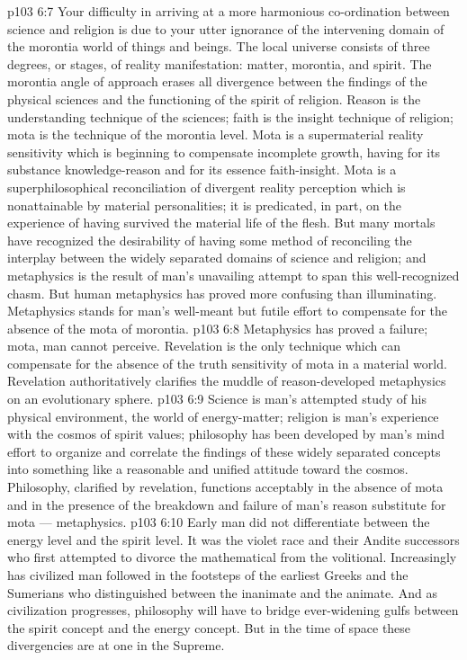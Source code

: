 \vs p103 6:7 Your difficulty in arriving at a more harmonious co\hyp{}ordination between science and religion is due to your utter ignorance of the intervening domain of the morontia world of things and beings. The local universe consists of three degrees, or stages, of reality manifestation: matter, morontia, and spirit. The morontia angle of approach erases all divergence between the findings of the physical sciences and the functioning of the spirit of religion. Reason is the understanding technique of the sciences; faith is the insight technique of religion; mota is the technique of the morontia level. Mota is a supermaterial reality sensitivity which is beginning to compensate incomplete growth, having for its substance knowledge\hyp{}reason and for its essence faith\hyp{}insight. Mota is a superphilosophical reconciliation of divergent reality perception which is nonattainable by material personalities; it is predicated, in part, on the experience of having survived the material life of the flesh. But many mortals have recognized the desirability of having some method of reconciling the interplay between the widely separated domains of science and religion; and metaphysics is the result of man’s unavailing attempt to span this well\hyp{}recognized chasm. But human metaphysics has proved more confusing than illuminating. Metaphysics stands for man’s well\hyp{}meant but futile effort to compensate for the absence of the mota of morontia.
\vs p103 6:8 \pc Metaphysics has proved a failure; mota, man cannot perceive. Revelation is the only technique which can compensate for the absence of the truth sensitivity of mota in a material world. Revelation authoritatively clarifies the muddle of reason\hyp{}developed metaphysics on an evolutionary sphere.
\vs p103 6:9 Science is man’s attempted study of his physical environment, the world of energy\hyp{}matter; religion is man’s experience with the cosmos of spirit values; philosophy has been developed by man’s mind effort to organize and correlate the findings of these widely separated concepts into something like a reasonable and unified attitude toward the cosmos. Philosophy, clarified by revelation, functions acceptably in the absence of mota and in the presence of the breakdown and failure of man’s reason substitute for mota --- metaphysics.
\vs p103 6:10 \pc Early man did not differentiate between the energy level and the spirit level. It was the violet race and their Andite successors who first attempted to divorce the mathematical from the volitional. Increasingly has civilized man followed in the footsteps of the earliest Greeks and the Sumerians who distinguished between the inanimate and the animate. And as civilization progresses, philosophy will have to bridge ever\hyp{}widening gulfs between the spirit concept and the energy concept. But in the time of space these divergencies are at one in the Supreme.
